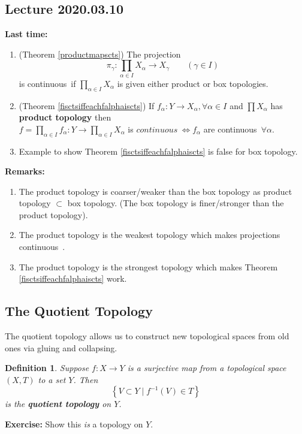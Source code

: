 \documentclass{article}
\newcommand{\cts}{continuous\ }
\newtheorem{sdefinition}[stheorem]{Definition}
\theoremstyle{remark}
\theoremstyle{example}
\theoremstyle{examples}
\begin{document}
	\subsection*{Lecture 2020.03.10}
	\textbf{Last time:}\\
	\begin{enumerate}
		\item (Theorem \ref{productmapscts}) The projection \[\pi_\gamma:\prod_{\alpha \in I}X_\alpha \to X_\gamma\qquad(\gamma \in I) \] is \cts if $\prod_{\alpha \in I}X_\alpha$ is given either product or box topologies.
		\item (Theorem \ref{fisctsiffeachfalphaiscts}) If $f_\alpha:Y \to X_\alpha,\forall \alpha \in I$ and $\prod X_\alpha$ has \textbf{product topology} then\\
		$f=\prod_{\alpha \in I}f_\alpha :Y \to \prod_{\alpha \in I}X_\alpha$ is $\cts \iff f_\alpha$ are \cts $\forall \alpha$.
		\item Example to show Theorem \ref{fisctsiffeachfalphaiscts} is false for box topology.
	\end{enumerate}
	\textbf{Remarks:} \begin{enumerate}
		\item The product topology is coarser/weaker than the box topology as product topology $\subset$ box topology. (The box topology is finer/stronger than the product topology).
		\item The product topology is the weakest topology which makes projections \cts.
		\item The product topology is the strongest topology which makes Theorem \ref{fisctsiffeachfalphaiscts} work.
	\end{enumerate}

	\subsection{The Quotient Topology}
	The quotient topology allows us to construct new topological spaces from old ones via gluing and collapsing.
	
	\setcounter{theorem}{3}
	\setcounter{stheorem}{0}
	\begin{sdefinition}
		\label{defquotienttopology}
		Suppose $f:X \to Y$ is a surjective map from a topological space $(X,T)$ to a \textit{set} $Y$. Then \[ \left\{ V \subset Y \mid f^{-1}(V) \in T \right\} \] is the \textbf{quotient topology} on $Y$.
	\end{sdefinition}
	\textbf{Exercise:} Show this \textit{is} a topology on $Y$.
	
\end{document}
